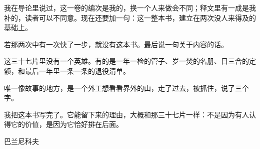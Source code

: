 我在导论里说过，这一卷的编次是我的，换一个人来做会不同；释文里有一成是我补的，读者可以不同意。现在还要加一句：这一整本书，建立在两次没人来得及的基础上。

若那两次中有一次快了一步，就没有这本书。最后说一句关于内容的话。

这三十七片里没有一个英雄。有的是一年一检的管子、岁一焚的名册、日三合的定额，和最后一年里一条一条的退役清单。

唯一像故事的地方，是一个外工想看看界外的山，走了过去，被抓住，说了三个字。

我把这本书写完了。它能留下来的理由，大概和那三十七片一样：不是因为有人认得它的价值，是因为它恰好排在后面。

\begin{flushright}
{\small 巴兰尼科夫}
\end{flushright}
